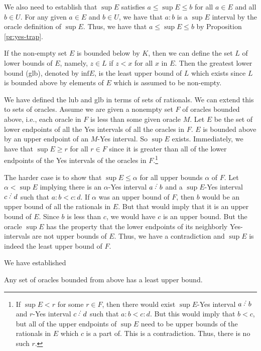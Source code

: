 \documentclass[12pt]{article}
\begin{document}
We also need to establish that $\sup E$ satisfies $a \leq \sup E \leq b$ for all $a \in E$ and all $b \in U$. For any given $a \in E$ and $b \in U$, we have that $a:b$ is a $\sup E$ interval by the oracle definition of $\sup E$. Thus, we have that $a \leq \sup E \leq b$ by Proposition \ref{pr:yes-trap}. 

If the non-empty set $E$ is bounded below by $K$, then we can define the set $L$ of lower bounds of $E$, namely, $z \in L$ if $z < x$ for all $x$ in $E$. Then the greatest lower bound (glb), denoted by $\mathrm{inf} E$, is the least upper bound of $L$ which exists since $L$ is bounded above by elements of $E$ which is assumed to be non-empty. 

We have defined the lub and glb in terms of sets of rationals. We can extend this to sets of oracles. Assume we are given a nonempty set $F$ of oracles bounded above, i.e., each oracle in $F$ is less than some given oracle $M$. Let $E$ be the set of lower endpoints of all the Yes intervals of all the oracles in $F$. $E$ is bounded above by an upper endpoint of an $M$-Yes interval. So $\sup E$ exists. Immediately, we have that $\sup E \geq r$ for all $r \in F$ since it is greater than all of the lower endpoints of the Yes intervals of the oracles in $F$.\footnote{If $\sup E < r$ for some $r \in F$, then there would exist $\sup E$-Yes interval $a \lte b$ and $r$-Yes interval $c\lte d$ such that $a:b < c:d$. But this would imply that $b < c$, but all of the upper endpoints of $\sup E$ need to be upper bounds of the rationals in $E$ which $c$ is a part of. This is a contradiction. Thus, there is no such $r$.}

The harder case is to show that $\sup E \leq \alpha$ for all upper bounds $\alpha$ of $F$. Let $\alpha < \sup E$ implying there is an $\alpha$-Yes interval $a\lte b$ and a $\sup E$-Yes interval $c\lte d$ such that $a:b < c:d$. If $\alpha$ was an upper bound of $F$, then $b$ would be an upper bound of all the rationals in $E$. But that would imply that it is an upper bound of $E$. Since $b$ is less than $c$, we would have $c$ is an upper bound. But the oracle $\sup E$ has the property that the lower endpoints of its neighborly Yes-intervals are not upper bounds of $E$. Thus, we have a contradiction and $\sup E$ is indeed the least upper bound of $F$.

We have established

\begin{theorem}\label{th:lub}
Any set of oracles bounded from above has a least upper bound. 
\end{theorem}
\end{document}
